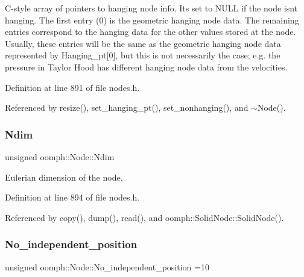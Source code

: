 C-\/style array of pointers to hanging node info. It\textquotesingle{}s set to N\+U\+LL if the node isn\textquotesingle{}t hanging. The first entry (0) is the geometric hanging node data. The remaining entries correspond to the hanging data for the other values stored at the node. Usually, these entries will be the same as the geometric hanging node data represented by Hanging\+\_\+pt\mbox{[}0\mbox{]}, but this is not necessarily the case; e.\+g. the pressure in Taylor Hood has different hanging node data from the velocities. 



Definition at line 891 of file nodes.\+h.



Referenced by resize(), set\+\_\+hanging\+\_\+pt(), set\+\_\+nonhanging(), and $\sim$\+Node().

\mbox{\label{classoomph_1_1Node_aa8ce049e9f9de38fa20d886a5c6b8116}} 
\subsubsection{\texorpdfstring{Ndim}{Ndim}}
{\footnotesize\ttfamily unsigned oomph\+::\+Node\+::\+Ndim\hspace{0.3cm}{\ttfamily [protected]}}



Eulerian dimension of the node. 



Definition at line 894 of file nodes.\+h.



Referenced by copy(), dump(), read(), and oomph\+::\+Solid\+Node\+::\+Solid\+Node().

\mbox{\label{classoomph_1_1Node_a4c2238b9aeac6cf2236ec3e03f34736e}} 
\subsubsection{\texorpdfstring{No\+\_\+independent\+\_\+position}{No\_independent\_position}}
{\footnotesize\ttfamily unsigned oomph\+::\+Node\+::\+No\+\_\+independent\+\_\+position =10\hspace{0.3cm}{\ttfamily [static]}}



